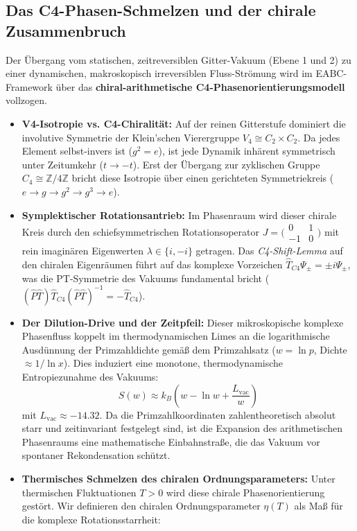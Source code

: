 \documentclass[11pt,a4paper]{article}
\begin{document}
	\subsection{Das C4-Phasen-Schmelzen und der chirale Zusammenbruch}
	Der Übergang vom statischen, zeitreversiblen Gitter-Vakuum (Ebene 1 und 2) zu einer dynamischen, makroskopisch irreversiblen Fluss-Strömung wird im EABC-Framework über das \textbf{chiral-arithmetische C4-Phasenorientierungsmodell} vollzogen.
	
	\begin{itemize}
		\item \textbf{V4-Isotropie vs. C4-Chiralität:} Auf der reinen Gitterstufe dominiert die involutive Symmetrie der Klein'schen Vierergruppe $V_4 \cong C_2 \times C_2$. Da jedes Element selbst-invers ist ($g^2 = e$), ist jede Dynamik inhärent symmetrisch unter Zeitumkehr ($t \to -t$). Erst der Übergang zur zyklischen Gruppe $C_4 \cong \mathbb{Z}/4\mathbb{Z}$ bricht diese Isotropie über einen gerichteten Symmetriekreis ($e \to g \to g^2 \to g^3 \to e$).
		\item \textbf{Symplektischer Rotationsantrieb:} Im Phasenraum wird dieser chirale Kreis durch den schiefsymmetrischen Rotationsoperator $J = \bigl( \begin{smallmatrix} 0 & 1 \\ -1 & 0 \end{smallmatrix} \bigr)$ mit rein imaginären Eigenwerten $\lambda \in \{i, -i\}$ getragen. Das \textit{C4-Shift-Lemma} auf den chiralen Eigenräumen führt auf das komplexe Vorzeichen $\hat{T}_{C4}\Psi_{\pm} = \pm i\Psi_{\pm}$, was die PT-Symmetrie des Vakuums fundamental bricht ($(\hat{P}\hat{T})\hat{T}_{C4}(\hat{P}\hat{T})^{-1} = -\hat{T}_{C4}$).
		\item \textbf{Der Dilution-Drive und der Zeitpfeil:} Dieser mikroskopische komplexe Phasenfluss koppelt im thermodynamischen Limes an die logarithmische Ausdünnung der Primzahldichte gemäß dem Primzahlsatz ($w = \ln p$, Dichte $\approx 1/\ln x$). Dies induziert eine monotone, thermodynamische Entropiezunahme des Vakuums:
		\begin{equation}
			S(w) \approx k_B \left( w - \ln w + \frac{L_{\text{vac}}}{w} \right)
		\end{equation}
		mit $L_{\text{vac}} \approx -14.32$. Da die Primzahlkoordinaten zahlentheoretisch absolut starr und zeitinvariant festgelegt sind, ist die Expansion des arithmetischen Phasenraums eine mathematische Einbahnstraße, die das Vakuum vor spontaner Rekondensation schützt.
		\item \textbf{Thermisches Schmelzen des chiralen Ordnungsparameters:} Unter thermischen Fluktuationen $T > 0$ wird diese chirale Phasenorientierung gestört. Wir definieren den chiralen Ordnungsparameter $\eta(T)$ als Maß für die komplexe Rotationsstarrheit:

\end{itemize}
\end{document}
